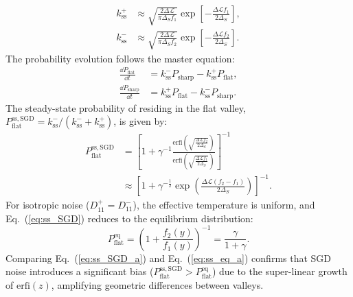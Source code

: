 \documentclass[aps,prx,reprint,superscriptaddress,longbibliography,nofootinbib,floatfix]{revtex4-2}
\begin{document}
\begin{equation} \label{eq:escape_rates}
    \begin{aligned} 
    k_\mathrm{ss}^{+} &\approx \sqrt{\frac{2 \Delta \mathcal{L}}{\pi \Delta_S f_1}} \exp\left[- \frac{\Delta \mathcal{L} f_1}{2\Delta_S} \right], \\
    k_\mathrm{ss}^{-} &\approx \sqrt{\frac{2 \Delta \mathcal{L}}{\pi \Delta_S f_2}} \exp\left[- \frac{\Delta \mathcal{L} f_2}{2\Delta_S} \right].
    \end{aligned}
\end{equation}
The probability evolution follows the master equation:
\begin{equation} 
    \begin{aligned}
    \frac{\dd P_\mathrm{flat}}{\dd t} &= k_\mathrm{ss}^{-} P_\mathrm{sharp} - k_\mathrm{ss}^{+} P_\mathrm{flat}, \\
    \frac{\dd P_\mathrm{sharp}}{\dd t} &= k_\mathrm{ss}^{+} P_\mathrm{flat} - k_\mathrm{ss}^{-} P_\mathrm{sharp}.
    \end{aligned}
\end{equation}
The steady-state probability of residing in the flat valley, $P_{\mathrm{flat}}^{\mathrm{ss,SGD}} = k_\mathrm{ss}^{-}/(k_\mathrm{ss}^{-} + k_\mathrm{ss}^{+})$, is given by:
\begin{equation}
\label{eq:ss_SGD_a}
\begin{split}
    P_{\mathrm{flat}}^{\mathrm{ss,SGD}}
  &= \left[1 + \gamma^{-1}\frac{\mathrm{erfi}\left(\sqrt{\frac{ \Delta \mathcal{L}f_2}{2\Delta_S}}\right)}
                      {\mathrm{erfi}\left(\sqrt{\frac{ \Delta \mathcal{L}f_1}{2\Delta_S}}\right)}\right]^{-1} \\
    &\approx  \left[1 + \gamma^{-\frac{1}{2}}
    \exp\left(\frac{\Delta \mathcal{L}(f_2-f_1)}{2\Delta_S}\right)\right]^{-1}.
\end{split}
\end{equation}
For isotropic noise ($D_{11}^+ = D_{11}^-$), the effective temperature is uniform, and Eq.~(\ref{eq:ss_SGD}) reduces to the equilibrium distribution:
\begin{equation}
\label{eq:ss_eq_a}
P_{\mathrm{flat}}^{\mathrm{eq}}
= \left(1 + \frac{f_2(y)}{f_1(y)}\right)^{-1}=\frac{\gamma}{1+\gamma}.
\end{equation}
Comparing Eq.~(\ref{eq:ss_SGD_a}) and Eq.~(\ref{eq:ss_eq_a}) confirms that SGD noise introduces a significant bias ($P_{\mathrm{flat}}^{\mathrm{ss,SGD}} > P_{\mathrm{flat}}^{\mathrm{eq}}$) due to the super-linear growth of $\mathrm{erfi}(z)$, amplifying geometric differences between valleys.
\end{document}
